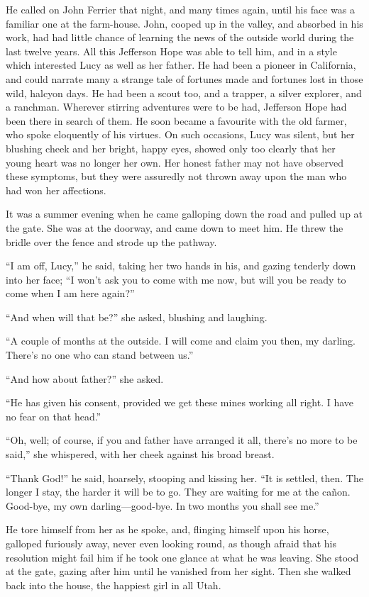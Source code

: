 \documentclass[12pt]{book}
\begin{document}
He called on John Ferrier that night, and many times again, until his face was a familiar one at the farm-house. John, cooped up in the valley, and absorbed in his work, had had little chance of learning the news of the outside world during the last twelve years. All this Jefferson Hope was able to tell him, and in a style which interested Lucy as well as her father. He had been a pioneer in California, and could narrate many a strange tale of fortunes made and fortunes lost in those wild, halcyon days. He had been a scout too, and a trapper, a silver explorer, and a ranchman. Wherever stirring adventures were to be had, Jefferson Hope had been there in search of them. He soon became a favourite with the old farmer, who spoke eloquently of his virtues. On such occasions, Lucy was silent, but her blushing cheek and her bright, happy eyes, showed only too clearly that her young heart was no longer her own. Her honest father may not have observed these symptoms, but they were assuredly not thrown away upon the man who had won her affections. 

It was a summer evening when he came galloping down the road and pulled up at the gate. She was at the doorway, and came down to meet him. He threw the bridle over the fence and strode up the pathway. 

“I am off, Lucy,” he said, taking her two hands in his, and gazing tenderly down into her face; “I won’t ask you to come with me now, but will you be ready to come when I am here again?” 

“And when will that be?” she asked, blushing and laughing. 

“A couple of months at the outside. I will come and claim you then, my darling. There’s no one who can stand between us.” 

“And how about father?” she asked. 

“He has given his consent, provided we get these mines working all right. I have no fear on that head.” 

“Oh, well; of course, if you and father have arranged it all, there’s no more to be said,” she whispered, with her cheek against his broad breast. 

“Thank God!” he said, hoarsely, stooping and kissing her. “It is settled, then. The longer I stay, the harder it will be to go. They are waiting for me at the cañon. Good-bye, my own darling—good-bye. In two months you shall see me.” 

He tore himself from her as he spoke, and, flinging himself upon his horse, galloped furiously away, never even looking round, as though afraid that his resolution might fail him if he took one glance at what he was leaving. She stood at the gate, gazing after him until he vanished from her sight. Then she walked back into the house, the happiest girl in all Utah. 
\end{document}
